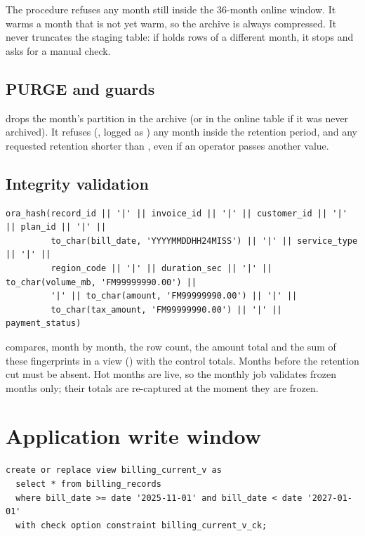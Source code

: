 The procedure refuses any month still inside the 36-month online window. It warms a month
that is not yet warm, so the archive is always compressed. It never truncates the staging
table: if  holds rows of a different month, it stops and asks for a
manual check.

\subsection{PURGE and guards}

 drops the month's partition in the archive (or in the online table if
it was never archived). It refuses (, logged as ) any month
inside the retention period, and any requested retention shorter than
, even if an operator passes another value.

\subsection{Integrity validation}

\needspace{0.3\textheight}
\begin{lstlisting}[style=sql, caption={Row fingerprint used by the control totals}]
ora_hash(record_id || '|' || invoice_id || '|' || customer_id || '|' || plan_id || '|' ||
         to_char(bill_date, 'YYYYMMDDHH24MISS') || '|' || service_type || '|' ||
         region_code || '|' || duration_sec || '|' || to_char(volume_mb, 'FM99999990.00') ||
         '|' || to_char(amount, 'FM99999990.00') || '|' ||
         to_char(tax_amount, 'FM99999990.00') || '|' || payment_status)
\end{lstlisting}

 compares, month by month, the row count, the amount total and the
sum of these fingerprints in a view () with the control totals. Months
before the retention cut must be absent. Hot months are live, so the monthly job validates
frozen months only; their totals are re-captured at the moment they are frozen.

\section{Application write window}

\needspace{0.3\textheight}
\begin{lstlisting}[style=sql, caption={View recreated by \code{refresh\_app\_window} (as of 2026-11)}]
create or replace view billing_current_v as
  select * from billing_records
  where bill_date >= date '2025-11-01' and bill_date < date '2027-01-01'
  with check option constraint billing_current_v_ck;
\end{lstlisting}

